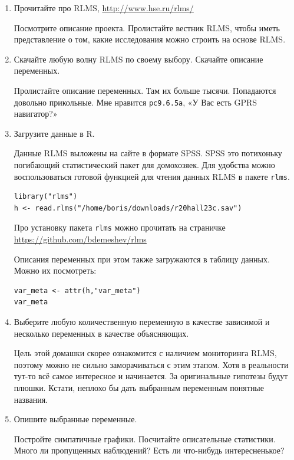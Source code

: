 \documentclass[12pt, a4paper]{article}
\begin{document}
\begin{enumerate}
\item Прочитайте про RLMS, \url{http://www.hse.ru/rlms/}

Посмотрите описание проекта. Пролистайте вестник RLMS, чтобы иметь представление о том, какие исследования можно строить на основе RLMS.

\item Скачайте любую волну RLMS по своему выбору. Скачайте описание переменных.

Пролистайте описание переменных. Там их больше тысячи. Попадаются довольно прикольные. Мне нравится \verb|pc9.6.5a|, «У Вас есть GPRS навигатор?»

\item Загрузите данные в R.

Данные RLMS выложены на сайте в формате SPSS. SPSS это потихоньку погибающий статистический пакет для домохозяек. Для удобства можно воспользоваться готовой функцией для чтения данных RLMS в пакете \verb|rlms|.
\begin{verbatim}
library("rlms")
h <- read.rlms("/home/boris/downloads/r20hall23c.sav")
\end{verbatim}
Про установку пакета \verb|rlms| можно прочитать на страничке \url{https://github.com/bdemeshev/rlms}

Описания переменных при этом также загружаются в таблицу данных. Можно их посмотреть:
\begin{verbatim}
var_meta <- attr(h,"var_meta")
var_meta
\end{verbatim}

\item Выберите любую количественную переменную в качестве зависимой и несколько переменных в качестве объясняющих.

Цель этой домашки скорее ознакомится с наличием мониторинга RLMS, поэтому можно не сильно заморачиваться с этим этапом. Хотя в реальности тут-то всё самое интересное и начинается. За оригинальные гипотезы будут плюшки. Кстати, неплохо бы дать выбранным переменным понятные названия.

\item Опишите выбранные переменные.

Постройте симпатичные графики. Посчитайте описательные статистики. Много ли пропущенных наблюдений? Есть ли что-нибудь интересненькое?


\end{enumerate}
\end{document}
